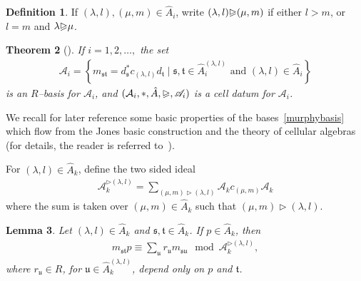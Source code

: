 \documentclass[11pt,a4paper,reqno,svgnames]{amsart}
\theoremstyle{plain}
\newtheorem{theorem}{Theorem}[section]
\newtheorem{lemma}[theorem]{Lemma}
\theoremstyle{definition}
\newtheorem{definition}[theorem]{Definition}
\numberwithin{equation}{section}
\begin{document}
\begin{definition}
If $(\lambda,l),(\mu,m)\in\hat{A}_i$, write $(\lambda,{l}){\trianglerighteqslant}(\mu,m)$ if either ${l}>m$, or $l=m$ and $\lambda{\trianglerighteqslant}\mu$. 
\end{definition}
\begin{theorem}[{\cite[Theorem~5.29]{EG:2012}}]\label{murphybasisthm}
If $i=1,2,\ldots,$ the set
\begin{align}\label{murphybasis}
\mathscr{A}_i=
\left\lbrace 
m_\mathfrak{st}=d_\mathfrak{s}^*c_{(\lambda,l)}d_\mathfrak{t}\mid \mathfrak{s},\mathfrak{t}\in\hat{A}_i^{(\lambda,l)}\text{ and } (\lambda,l)\in\hat{A}_i
\right\rbrace
\end{align}
is an $R$--basis for $\mathcal{A}_i$, and $(\mathcal{A}_i,*,\hat{A},{\trianglerighteqslant},\mathscr{A}_i)$ is a cell datum for $\mathcal{A}_i$. 
\end{theorem}
We recall for later reference some basic properties of the bases~\eqref{murphybasis} which flow from the Jones basic construction and the theory of cellular algebras (for details, the reader is referred to~\cite{MR1376244,  MR2774622, MR2794027, EG:2012}).

For $(\lambda,l)\in\hat{A}_k$, define the two sided ideal
\begin{align*}
\mathcal{A}_{k}^{\rhd(\lambda,{l})}=
\sum_{(\mu,m)\rhd(\lambda,{l})} \mathcal{A}_k c_{(\mu,m)}\mathcal{A}_k
\end{align*}
where the sum is taken over $(\mu,m)\in\hat{A}_k$ such that $(\mu,m)\rhd(\lambda,{l})$. 
\begin{lemma}\label{cellaction}
Let $(\lambda,l)\in\hat{A}_k$ and $\mathfrak{s,t}\in\hat{A}_k$. If $p\in\hat{A}_k$, then 
\begin{align}\label{rightaction}
m_\mathfrak{st}p\equiv \sum_{\mathfrak{u}}r_\mathfrak{u}m_\mathfrak{su}\mod \mathcal{A}_k^{\rhd(\lambda,l)},
\end{align}
where $r_\mathfrak{u}\in R$, for $\mathfrak{u}\in\hat{A}_k^{(\lambda,l)}$, depend only on $p$ and $\mathfrak{t}$. 
\end{lemma}
\end{document}
